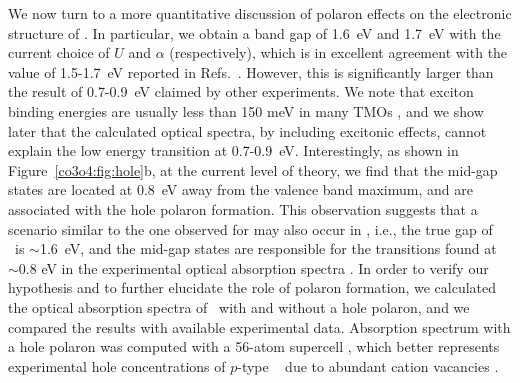 We now turn to a more quantitative discussion of polaron effects on the electronic structure of \co. In particular, we obtain a band gap of 1.6~eV and 1.7~eV with the current choice of $U$ and $\alpha$ (respectively), which is in excellent agreement with the value of 1.5-1.7~eV reported in Refs.~\cite{lohaus2016,jiang2014,waegele2014,shinde2006,belova1983,lima2014,cheng1998}. However, this is significantly larger than the result of 0.7-0.9~eV claimed by other experiments. \cite{qiao2013,singh2014,sousa2019,martens1985}
We note that exciton binding energies are usually less than 150 meV in many TMOs \cite{ping20132electronic,le2014,ping2013}, and we show later that the calculated optical spectra, by including excitonic effects, cannot explain the low energy transition at 0.7-0.9~eV.
Interestingly, as shown in Figure~\ref{co3o4:fig:hole}b, at the current level of theory, we find that the mid-gap states are located at 0.8~eV away from the valence band maximum, and are associated with the hole polaron formation. This observation suggests that a scenario similar to the one observed for  may also occur in \co, i.e., the true gap of \co\ is $\sim$1.6~eV, and the mid-gap states are responsible for the transitions found at $\sim$0.8 eV in the experimental optical absorption spectra \cite{qiao2013,singh2014,sousa2019,martens1985}.
In order to verify our hypothesis and to further elucidate the role of polaron formation, we calculated the optical absorption spectra of \co\ with and without a hole polaron, and we compared the results with available experimental data. Absorption spectrum with a hole polaron was computed with a 56-atom supercell \cite{concentrationNote}, which better represents experimental hole concentrations of $p$-type \co\ \cite{waegele2014,lohaus2016} due to abundant cation vacancies \cite{tronel2006,godillot2013}.

